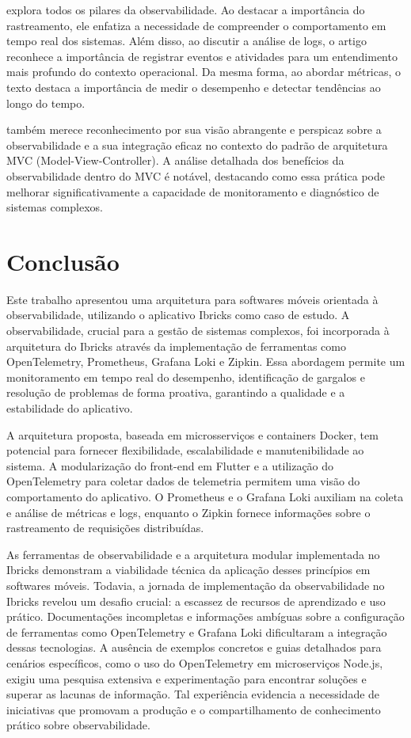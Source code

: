 \documentclass[12pt]{article}
\begin{document}
\cite{dos2022observabilidade} explora todos os pilares da observabilidade. Ao destacar a importância do rastreamento, ele enfatiza a necessidade de compreender o comportamento em tempo real dos sistemas. Além disso, ao discutir a análise de logs, o artigo reconhece a importância de registrar eventos e atividades para um entendimento mais profundo do contexto operacional. Da mesma forma, ao abordar métricas, o texto destaca a importância de medir o desempenho e detectar tendências ao longo do tempo. 

\cite{tamburri2018devops} também merece reconhecimento por sua visão abrangente e perspicaz sobre a observabilidade e a sua integração eficaz no contexto do padrão de arquitetura MVC (Model-View-Controller). A análise detalhada dos benefícios da observabilidade dentro do MVC é notável, destacando como essa prática pode melhorar significativamente a capacidade de monitoramento e diagnóstico de sistemas complexos. 

\section{Conclusão}

Este trabalho apresentou uma arquitetura para softwares móveis orientada à observabilidade, utilizando o aplicativo Ibricks como caso de estudo. A observabilidade, crucial para a gestão de sistemas complexos, foi incorporada à arquitetura do Ibricks através da implementação de ferramentas como OpenTelemetry, Prometheus, Grafana Loki e Zipkin. Essa abordagem permite um monitoramento em tempo real do desempenho, identificação de gargalos e resolução de problemas de forma proativa, garantindo a qualidade e a estabilidade do aplicativo.

A arquitetura proposta, baseada em microsserviços e containers Docker, tem potencial para fornecer flexibilidade, escalabilidade e manutenibilidade ao sistema. A modularização do front-end em Flutter e a utilização do OpenTelemetry para coletar dados de telemetria permitem uma visão do comportamento do aplicativo. O Prometheus e o Grafana Loki auxiliam na coleta e análise de métricas e logs, enquanto o Zipkin fornece informações sobre o rastreamento de requisições distribuídas.

As ferramentas de observabilidade e a arquitetura modular implementada no Ibricks demonstram a viabilidade técnica da aplicação desses princípios em softwares móveis. Todavia, a jornada de implementação da observabilidade no Ibricks revelou um desafio crucial: a escassez de recursos de aprendizado e uso prático. Documentações incompletas e informações ambíguas sobre a configuração de ferramentas como OpenTelemetry e Grafana Loki dificultaram a integração dessas tecnologias. A ausência de exemplos concretos e guias detalhados para cenários específicos, como o uso do OpenTelemetry em microserviços Node.js, exigiu uma pesquisa extensiva e experimentação para encontrar soluções e superar as lacunas de informação. Tal experiência evidencia a necessidade de iniciativas que promovam a produção e o compartilhamento de conhecimento prático sobre observabilidade.
\end{document}
